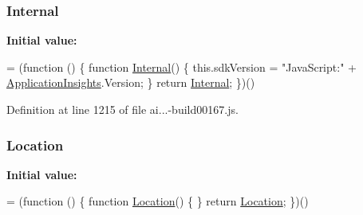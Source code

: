 \subsubsection[{\texorpdfstring{Internal}{Internal}}]{ Internal}\hypertarget{_scripts_2ai_80_822_89-build00167_8js_a259cf48ccc03a91135eacb5dbc0cf8b6}{}\label{_scripts_2ai_80_822_89-build00167_8js_a259cf48ccc03a91135eacb5dbc0cf8b6}
{\bfseries Initial value\+:}
\begin{DoxyCode}
= (\textcolor{keyword}{function} () \{
                \textcolor{keyword}{function} \hyperlink{obj_2_release_2_package_2_package_tmp_2_scripts_2ai_80_822_89-build00167_8js_a259cf48ccc03a91135eacb5dbc0cf8b6}{Internal}() \{
                    this.sdkVersion = \textcolor{stringliteral}{"JavaScript:"} + \hyperlink{obj_2_release_2_package_2_package_tmp_2_scripts_2ai_80_822_89-build00167_8js_aa415ef4f8cdd699689ef4b61db7656d8}{ApplicationInsights}.Version;
                \}
                \textcolor{keywordflow}{return} \hyperlink{obj_2_release_2_package_2_package_tmp_2_scripts_2ai_80_822_89-build00167_8js_a259cf48ccc03a91135eacb5dbc0cf8b6}{Internal};
            \})()
\end{DoxyCode}


Definition at line 1215 of file ai...-\/build00167.\+js.

\subsubsection[{\texorpdfstring{Location}{Location}}]{ Location}\hypertarget{_scripts_2ai_80_822_89-build00167_8js_a107c5219a275c2c75548b48049eb29d7}{}\label{_scripts_2ai_80_822_89-build00167_8js_a107c5219a275c2c75548b48049eb29d7}
{\bfseries Initial value\+:}
\begin{DoxyCode}
= (\textcolor{keyword}{function} () \{
                \textcolor{keyword}{function} \hyperlink{obj_2_release_2_package_2_package_tmp_2_scripts_2ai_80_822_89-build00167_8js_a107c5219a275c2c75548b48049eb29d7}{Location}() \{
                \}
                \textcolor{keywordflow}{return} \hyperlink{obj_2_release_2_package_2_package_tmp_2_scripts_2ai_80_822_89-build00167_8js_a107c5219a275c2c75548b48049eb29d7}{Location};
            \})()
\end{DoxyCode}



